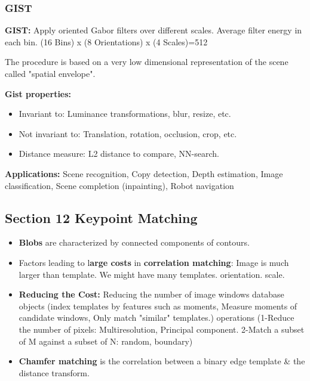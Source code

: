\documentclass{../cheat}
\begin{document}
\begin{multicols}{3}
		
		\subsubsection{GIST}
			\textbf{GIST:} Apply oriented Gabor filters over different scales. Average filter energy in each bin.
			(16 Bins) x (8 Orientations) x (4 Scales)=512
			
			The procedure is based on a very low dimensional representation of the scene called "spatial envelope".
			
			\textbf{Gist properties:}
			\begin{itemize}
				\item Invariant to: Luminance transformations, blur, resize, etc.
				\item Not invariant to: Translation, rotation, occlusion, crop, etc.
				\item Distance measure: L2 distance to compare, NN-search.
			\end{itemize}
			\textbf{Applications:} Scene recognition, Copy detection, Depth estimation, Image classification, Scene completion (inpainting), Robot navigation
			 
			 
	\subsection{Section 12 Keypoint Matching}
	\begin{itemize}[nolistsep, leftmargin=1em]
		\item \textbf{Blobs} are characterized by connected components of contours.
		
		\item Factors leading to l\textbf{arge costs} in \textbf{correlation matching}:
			 Image is much larger than template. 
			 We might have many templates.
			 orientation.
			 scale.
		
		\item \textbf{Reducing the Cost:} Reducing the number of 
			 image windows
			 database objects 
				(index templates by features such as moments, Measure moments of candidate windows, Only match "similar" templates.)
			 operations (1-Reduce the number of pixels: Multiresolution, Principal component. 2-Match a subset of M against a subset of N: random, boundary)
			
		\item \textbf{Chamfer matching} is the correlation between a binary edge template \& the distance transform.
		

\end{itemize}
\end{multicols}
\end{document}
